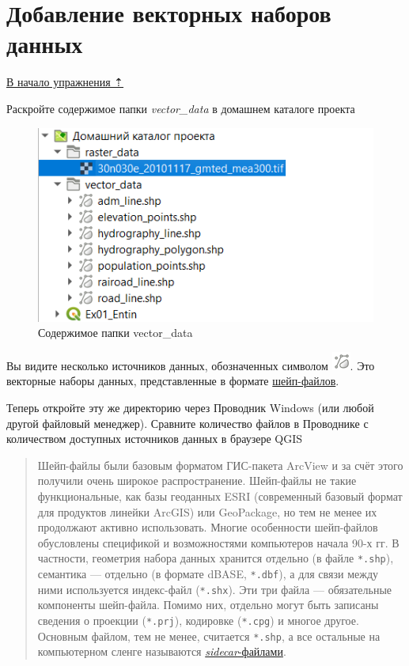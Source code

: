 \documentclass[
  12pt,
]{book}
\begin{document}
\hypertarget{map-design-general-vector}{%
\section{Добавление векторных наборов данных}\label{map-design-general-vector}}

\protect\hyperlink{map-design-general}{В начало упражнения ⇡}

Раскройте содержимое папки \emph{vector\_data} в домашнем каталоге проекта

\begin{figure}
\centering
\includegraphics{images/Ex01_MapGeneral/DefaultLocation.png}
\caption{Содержимое папки vector\_data}
\end{figure}

Вы видите несколько источников данных, обозначенных символом \includegraphics{images/Ex01_MapGeneral/vector.png}. Это векторные наборы данных, представленные в формате \href{https://desktop.arcgis.com/ru/arcmap/latest/manage-data/shapefiles/what-is-a-shapefile.htm}{шейп-файлов}.

Теперь откройте эту же директорию через Проводник Windows (или любой другой файловый менеджер). Сравните количество файлов в Проводнике с количеством доступных источников данных в браузере QGIS

\begin{quote}
Шейп-файлы были базовым форматом ГИС-пакета ArcView и за счёт этого получили очень широкое распространение. Шейп-файлы не такие функциональные, как базы геоданных ESRI (современный базовый формат для продуктов линейки ArcGIS) или GeoPackage, но тем не менее их продолжают активно использовать. Многие особенности шейп-файлов обусловлены спецификой и возможностями компьютеров начала 90-х гг. В частности, геометрия набора данных хранится отдельно (в файле \texttt{*.shp}), семантика --- отдельно (в формате dBASE, \texttt{*.dbf}), а для связи между ними используется индекс-файл (\texttt{*.shx}). Эти три файла --- обязательные компоненты шейп-файла. Помимо них, отдельно могут быть записаны сведения о проекции (\texttt{*.prj}), кодировке (\texttt{*.cpg}) и многое другое. Основным файлом, тем не менее, считается \texttt{*.shp}, а все остальные на компьютерном сленге называются \href{https://en.wikipedia.org/wiki/Sidecar_file}{\emph{sidecar}-файлами}.
\end{quote}
\end{document}
